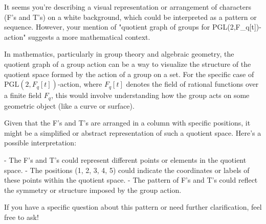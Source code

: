 It seems you're describing a visual representation or arrangement of characters (F's and T's) on a white background, which could be interpreted as a pattern or sequence. However, your mention of "quotient graph of groups for PGL(2,F_q[t])-action" suggests a more mathematical context.

In mathematics, particularly in group theory and algebraic geometry, the quotient graph of a group action can be a way to visualize the structure of the quotient space formed by the action of a group on a set. For the specific case of \( \text{PGL}(2, F_q[t]) \)-action, where \( F_q[t] \) denotes the field of rational functions over a finite field \( F_q \), this would involve understanding how the group acts on some geometric object (like a curve or surface).

Given that the F's and T's are arranged in a column with specific positions, it might be a simplified or abstract representation of such a quotient space. Here’s a possible interpretation:

- The F's and T's could represent different points or elements in the quotient space.
- The positions (1, 2, 3, 4, 5) could indicate the coordinates or labels of these points within the quotient space.
- The pattern of F's and T's could reflect the symmetry or structure imposed by the group action.

If you have a specific question about this pattern or need further clarification, feel free to ask!